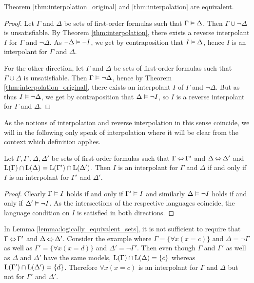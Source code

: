 \begin{prop}
	Theorem \ref{thm:interpolation_original} and \ref{thm:interpolation} are equivalent.
	\label{prop:interpolations_equivalent}
\end{prop}
\begin{proof}
	Let $\Gamma$ and $\Delta$ be sets of first-order formulas such that $ \Gamma \vDash \Delta$.
	Then $\Gamma \cup \lnot \Delta$ is unsatisfiable.
	By Theorem \ref{thm:interpolation}, there exists a reverse interpolant $I$ for $\Gamma$ and $\lnot \Delta$.
	As $\lnot \Delta \vDash \lnot I$, we get by contraposition that $I \vDash \Delta$, hence $I$ is an interpolant for $\Gamma$ and $\Delta$.

	For the other direction,
	let $\Gamma$ and $\Delta$ be sets of first-order formulas such that $ \Gamma \cup \Delta$ is unsatisfiable.
	Then $\Gamma \vDash \lnot \Delta$, hence by Theorem \ref{thm:interpolation_original}, there exists an interpolant $I$ of $\Gamma$ and $\lnot \Delta$.
	But as thus $ I\vDash \lnot \Delta$, we get by contraposition that $\Delta \vDash \lnot I$, so $I$ is a reverse interpolant for $\Gamma$ and $\Delta$.
\end{proof}

As the notions of interpolation and reverse interpolation in this sense coincide, we will in the following only speak of interpolation where it will be clear from the context which definition applies.

\begin{lemma}
	\label{lemma:logically_equivalent_sets}
	Let $\Gamma, \Gamma', \Delta, \Delta'$ be sets of first-order formulas such that $\Gamma \operatorname{\Leftrightarrow} \Gamma'$ and $\Delta \operatorname{\Leftrightarrow} \Delta'$ and $\operatorname{L}(\Gamma) \cap \operatorname{L}(\Delta) = \operatorname{L}(\Gamma') \cap \operatorname{L}(\Delta')$.
	Then $I$ is an interpolant for $\Gamma$ and $\Delta$ if and only if $I$ is an interpolant for $\Gamma'$ and $\Delta'$.
\end{lemma}
\begin{proof}
	Clearly $\Gamma \vDash I$ holds if and only if $\Gamma' \vDash I$ and similarly
	$\Delta \vDash \lnot I$ holds if and only if $\Delta' \vDash \lnot I$.
	As the intersections of the respective languages coincide, the language condition on $I$ is satisfied in both directions.
\end{proof}

\begin{remark}
	In Lemma \ref{lemma:logically_equivalent_sets}, it is not sufficient to require that $\Gamma \operatorname{\Leftrightarrow} \Gamma'$ and $\Delta \operatorname{\Leftrightarrow} \Delta'$. 
	Consider the example where
	$\Gamma = \{ \forall x (x=c)\}$ and $\Delta = \lnot \Gamma$
	as well as  
	$\Gamma' = \{ \forall x (x=d)\}$ and $\Delta' = \lnot \Gamma'$.
	Then even though $\Gamma$ and $\Gamma'$ as well as $\Delta$ and $\Delta'$ have the same models,
	$\operatorname{L}(\Gamma) \cap \operatorname{L}(\Delta) = \{c\}$
	whereas
	$\operatorname{L}(\Gamma') \cap \operatorname{L}(\Delta') = \{d\}$.
	Therefore $\forall x (x=c)$ is an interpolant for $\Gamma$ and $\Delta$ but not for $\Gamma'$ and $\Delta'$.
\end{remark}



